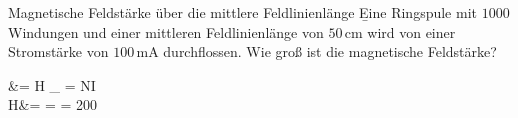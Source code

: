 \begin{frame} 
	\begin{bsp}{Magnetische Feldstärke über die mittlere Feldlinienlänge}{}
		\b{Eine Ringspule mit $1000$ Windungen und einer mittleren Feldlinienlänge von $50\,\mathrm{cm}$ wird von einer Stromstärke von $100\,\mathrm{mA}$ durchflossen. Wie groß ist die magnetische Feldstärke?}%
		\begin{eqa}
			\varTheta &= H \cdot \ell_{} = N\cdot I\nonumber\\
			\onslide<3->H&=
			\onslide<4->= = 200\,\nonumber
			\onslide<1->
		\end{eqa}
	\end{bsp}


\end{frame}
